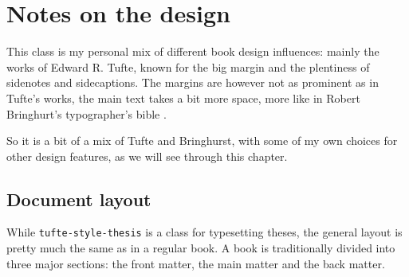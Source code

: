 
\chapter{Notes on the design}

This class is my personal mix of different book design influences: mainly the works of Edward R. Tufte,
\parencite{heltbergSpatialHeterogeneityAffects2022a, korneliussenANGSDAnalysisNext2014} known for the big margin and the plentiness of
sidenotes and sidecaptions. The margins are however not as prominent as in Tufte's works, the main text takes a bit more space,
more like in Robert Bringhurt's typographer's bible \autocite{heltbergSpatialHeterogeneityAffects2022a}.

So it is a bit of a mix of Tufte and Bringhurst,
with some of my own choices for other design features, as we will see through this chapter.

\section{Document layout}

While \texttt{tufte-style-thesis} is a class for typesetting theses,
the general layout is pretty much the same as in a regular book.
A book is traditionally divided into three major sections:
the front matter, the main matter and the back matter.


